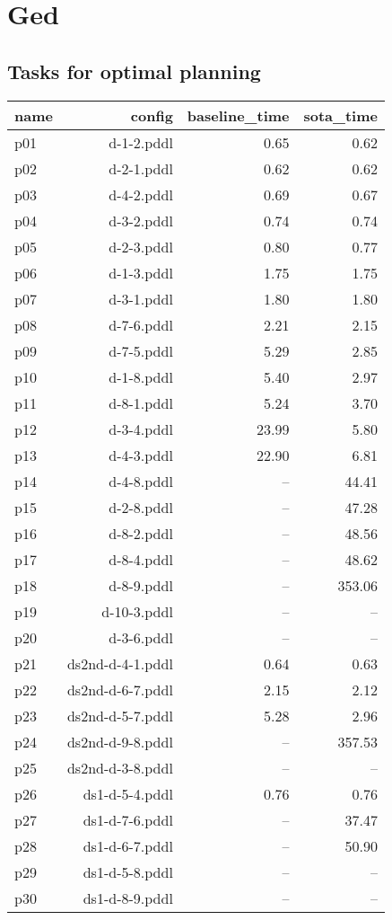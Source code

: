\documentclass{article}
\begin{document}
                \newpage \section{Ged}
                    \subsection*{Tasks for optimal planning}
                    
                            \begin{center}
                            \scriptsize
                            \begin{tabular}{@{}l|r|r|r@{}}
                            name & config & baseline\_time & sota\_time\\\midrule
                              p01& d-1-2.pddl&0.65&0.62\\
  p02& d-2-1.pddl&0.62&0.62\\
  p03& d-4-2.pddl&0.69&0.67\\
  p04& d-3-2.pddl&0.74&0.74\\
  p05& d-2-3.pddl&0.80&0.77\\
  p06& d-1-3.pddl&1.75&1.75\\
  p07& d-3-1.pddl&1.80&1.80\\
  p08& d-7-6.pddl&2.21&2.15\\
  p09& d-7-5.pddl&5.29&2.85\\
  p10& d-1-8.pddl&5.40&2.97\\
  p11& d-8-1.pddl&5.24&3.70\\
  p12& d-3-4.pddl&23.99&5.80\\
  p13& d-4-3.pddl&22.90&6.81\\
  p14& d-4-8.pddl&--&44.41\\
  p15& d-2-8.pddl&--&47.28\\
  p16& d-8-2.pddl&--&48.56\\
  p17& d-8-4.pddl&--&48.62\\
  p18& d-8-9.pddl&--&353.06\\
  p19& d-10-3.pddl&--&--\\
  p20& d-3-6.pddl&--&--\\
  p21& ds2nd-d-4-1.pddl&0.64&0.63\\
  p22& ds2nd-d-6-7.pddl&2.15&2.12\\
  p23& ds2nd-d-5-7.pddl&5.28&2.96\\
  p24& ds2nd-d-9-8.pddl&--&357.53\\
  p25& ds2nd-d-3-8.pddl&--&--\\
  p26& ds1-d-5-4.pddl&0.76&0.76\\
  p27& ds1-d-7-6.pddl&--&37.47\\
  p28& ds1-d-6-7.pddl&--&50.90\\
  p29& ds1-d-5-8.pddl&--&--\\
  p30& ds1-d-8-9.pddl&--&--
                            \end{tabular}
                            \end{center}
                    
\end{document}
